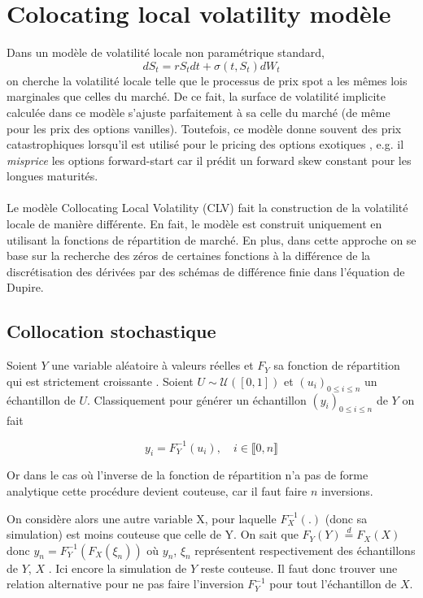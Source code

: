 \documentclass[a4paper,12pt]{report}
\numberwithin{equation}{section}
\theoremstyle{definition}
\numberwithin{equation}{section}
\begin{document}
\chapter{Colocating local volatility modèle}
\label{clvmdl}
Dans un modèle de volatilité locale non paramétrique standard,
$$  dS_t= r S_t dt + \sigma(t, S_t)dW_t$$
on cherche la volatilité locale telle que le processus de prix spot a les mêmes lois marginales que celles du marché. De ce fait, la surface de volatilité implicite calculée dans ce modèle s'ajuste parfaitement à sa celle du marché (de même pour les prix des options vanilles). Toutefois, ce modèle donne souvent des prix catastrophiques lorsqu'il est utilisé pour le pricing des options exotiques , e.g. il \textit{misprice} les options forward-start car il prédit un forward skew constant pour les longues maturités.  
\\\\
Le modèle Collocating Local Volatility \cite{CLV} (CLV) fait la construction de la  volatilité locale de manière différente. En fait, le modèle est construit uniquement en utilisant la fonctions de répartition de marché. En plus, dans cette approche on se base sur la recherche des zéros de certaines fonctions à la différence de la discrétisation des dérivées par des schémas de différence finie dans l'équation de Dupire.
\section{Collocation stochastique}
Soient $Y$ une variable aléatoire à valeurs réelles et $F_{Y}$ sa fonction de répartition qui est strictement croissante . Soient $U\sim\mathcal{U}([0,1])$ et $(u_{i})_{0\leq i \leq n}$ un échantillon de $U$. Classiquement pour générer un échantillon $(y_i)_{0\leq i \leq n}$ de $Y$ on fait

$$y_{i}=F_{Y}^{-1}(u_{i}),\quad i\in \llbracket 0, n\rrbracket$$

Or dans le cas où l'inverse de la fonction de répartition n'a pas de forme analytique cette procédure devient couteuse, car il faut faire $n$ inversions.

On considère alors une autre variable X, pour laquelle $F_{X}^{-1}(.)$ (donc sa simulation) est moins couteuse que celle de Y. On sait que $F_{Y}(Y)\overset{d}{=}F_{X}(X)$ donc $y_{n}=F_{Y}^{-1}(F_{X}(\xi_{n}))$ où $y_{n}$, $\xi_{n}$ représentent respectivement des échantillons de $Y$, $ X$ . Ici encore la simulation de $Y$ reste couteuse. Il faut donc trouver une relation alternative pour ne pas faire l'inversion $F_{Y}^{-1}$ pour tout l'échantillon de $X$.
\end{document}

